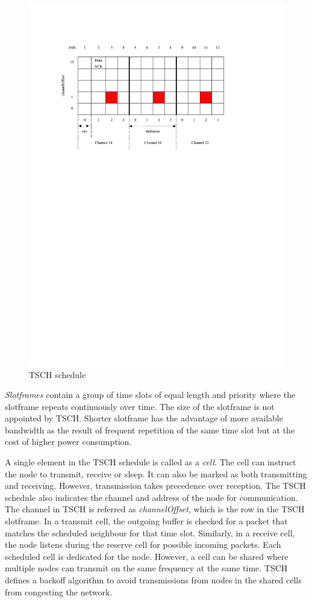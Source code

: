 \begin{figure}
\centering
\includegraphics[trim=2cm 17cm 4cm 3cm, clip=true, totalheight=0.40\textheight]{tsch.pdf}
\caption{TSCH schedule}
\label{fig_tsch}
\end{figure}

\textit{Slotframes} contain a group of time slots of equal length and priority where the slotframe repeats continuously over time. The size of the slotframe is not appointed by TSCH. Shorter slotframe has the advantage of more available bandwidth as the result of frequent repetition of the same time slot but at the cost of higher power consumption. 

A single element in the TSCH schedule is called as a \textit{cell}. The cell can instruct the node to transmit, receive or sleep. It can also be marked as both transmitting and receiving. However, transmission takes precedence over reception. The TSCH schedule also indicates the channel and address of the node for communication. The channel in TSCH is referred as \textit{channelOffset}, which is the row in the TSCH slotframe. In a transmit cell, the outgoing buffer is checked for a packet that matches the scheduled neighbour for that time slot. Similarly, in a receive cell, the node listens during the reserve cell for possible incoming packets. Each scheduled cell is dedicated for the node. However, a cell can be shared where multiple nodes can transmit on the same frequency at the same time. TSCH defines a backoff algorithm to avoid transmissions from nodes in the shared cells from congesting the network.

